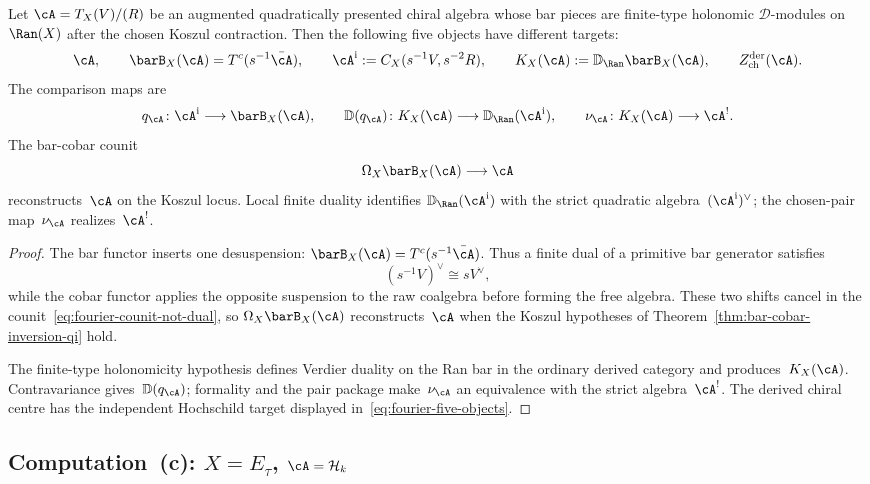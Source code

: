 \begin{proposition}
\label{prop:fourier-five-duality-objects}
Let $\cA=T_X(V)/(R)$ be an augmented quadratically presented chiral
algebra whose bar pieces are finite-type holonomic
$\mathcal D$-modules on $\Ran(X)$ after the chosen Koszul contraction.
Then the following five objects have different targets:
\begin{equation}\label{eq:fourier-five-objects}
\cA,\qquad
\barB_X(\cA)=T^c(s^{-1}\bar\cA),\qquad
\cA^{\mathrm i}:=C_X(s^{-1}V,s^{-2}R),\qquad
K_X(\cA):=\mathbb{D}_{\Ran}\barB_X(\cA),\qquad
Z^{\mathrm{der}}_{\mathrm{ch}}(\cA).
\end{equation}
The comparison maps are
\[
q_\cA\colon\cA^{\mathrm i}\longrightarrow\barB_X(\cA),
\qquad
\mathbb D(q_\cA)\colon K_X(\cA)\longrightarrow
\mathbb D_{\Ran}(\cA^{\mathrm i}),
\qquad
\nu_\cA\colon K_X(\cA)\longrightarrow\cA^!.
\]
The bar-cobar counit
\begin{equation}\label{eq:fourier-counit-not-dual}
\Omega_X\barB_X(\cA)\longrightarrow \cA
\end{equation}
reconstructs~$\cA$ on the Koszul locus.  Local finite duality
identifies $\mathbb D_{\Ran}(\cA^{\mathrm i})$ with the strict
quadratic algebra~$(\cA^{\mathrm i})^\vee$; the chosen-pair
map~$\nu_\cA$ realizes~$\cA^!$.
\end{proposition}

\begin{proof}
The bar functor inserts one desuspension:
$\barB_X(\cA)=T^c(s^{-1}\bar\cA)$. Thus a finite dual of a primitive
bar generator satisfies
\[
(s^{-1}V)^\vee \cong sV^\vee,
\]
while the cobar functor applies the opposite suspension to the raw
coalgebra before forming the free algebra. These two shifts cancel in
the counit~\eqref{eq:fourier-counit-not-dual}, so
$\Omega_X\barB_X(\cA)$ reconstructs~$\cA$ when the Koszul hypotheses
of Theorem~\ref{thm:bar-cobar-inversion-qi} hold.

The finite-type holonomicity hypothesis defines Verdier duality on the
Ran bar in the ordinary derived category and produces~$K_X(\cA)$.
Contravariance gives~$\mathbb D(q_\cA)$; formality and the pair package
make~$\nu_\cA$ an equivalence with the strict algebra~$\cA^!$.  The
derived chiral centre has the independent Hochschild target displayed
in~\eqref{eq:fourier-five-objects}.
\end{proof}

\subsection*{Computation~(c): $X = E_\tau$,
 $\cA = \mathcal{H}_k$}


